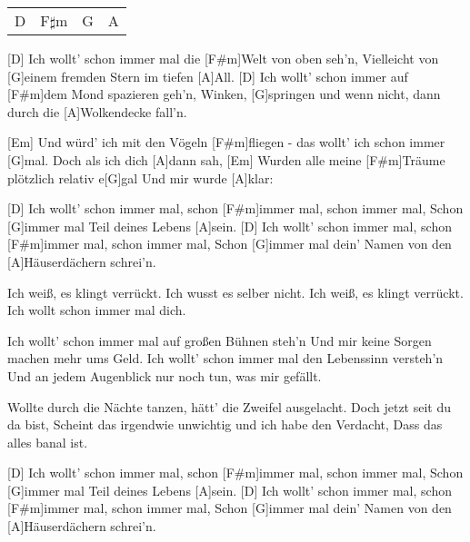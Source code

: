 

\begin{guitar}
	 {\footnotesize\begin{tabular}{|l|l|l|l|}
			D & F$\sharp$m & G & A	
	\end{tabular}}
	
	[D] Ich wollt' schon immer mal die [F#m]Welt von oben seh'n,
	Vielleicht von [G]einem fremden Stern im tiefen [A]All.
	[D] Ich wollt' schon immer auf [F#m]dem Mond spazieren geh'n,
	Winken, [G]springen und wenn nicht, dann durch die [A]Wolkendecke fall'n.
	
	[Em] Und würd' ich mit den Vögeln [F#m]fliegen - das wollt' ich schon immer [G]mal.
	Doch als ich dich [A]dann sah,
	[Em] Wurden alle meine [F#m]Träume plötzlich relativ e[G]gal
	Und mir wurde [A]klar:
	
	\begin{highlightbar}
		[D] Ich wollt' schon immer mal, schon [F#m]immer mal, schon immer mal,
		Schon [G]immer mal Teil deines Lebens [A]sein.
		[D] Ich wollt' schon immer mal, schon [F#m]immer mal, schon immer mal,
		Schon [G]immer mal dein' Namen von den [A]Häuserdächern schrei'n.
	\end{highlightbar}
	
	\songsection{Bridge}
	Ich weiß, es klingt verrückt. Ich wusst es selber nicht.
	Ich weiß, es klingt verrückt. Ich wollt schon immer mal dich.
	
	\songsection{Strophe 2}
	Ich wollt' schon immer mal auf großen Bühnen steh'n
	Und mir keine Sorgen machen mehr ums Geld.
	Ich wollt' schon immer mal den Lebenssinn versteh'n
	Und an jedem Augenblick nur noch tun, was mir gefällt.
	
	\songsection{Bridge}
	Wollte durch die Nächte tanzen, hätt' die Zweifel ausgelacht.
	Doch jetzt seit du da bist,
	Scheint das irgendwie unwichtig und ich habe den Verdacht,
	Dass das alles banal ist.
	
	\begin{highlightbar}
		\songsection{Refrain}
		[D] Ich wollt' schon immer mal, schon [F#m]immer mal, schon immer mal,
		Schon [G]immer mal Teil deines Lebens [A]sein.
		[D] Ich wollt' schon immer mal, schon [F#m]immer mal, schon immer mal,
		Schon [G]immer mal dein' Namen von den [A]Häuserdächern schrei'n.
	\end{highlightbar}
	

\end{guitar}
